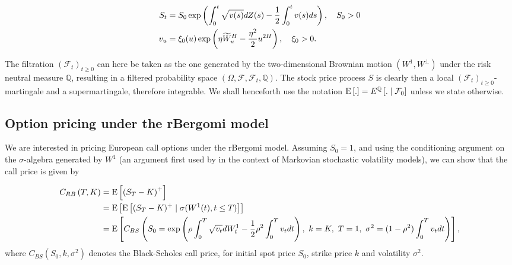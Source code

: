 \begin{align}\label{eq:rBergomi_model}
	S_t&= S_0  \operatorname{exp}\left( \int_{0}^{t} \sqrt{v(s)} dZ(s)- \frac{1}{2} \int_{0}^{t} v(s) ds   \right),\quad S_0>0 \nonumber\\
	v_u&=\xi_0(u) \operatorname{exp}\left( \eta \widetilde{W}_u^H- \frac{\eta^2}{2} u^{2H} \right), \quad \xi_0>0 .
\end{align}


The filtration $(\mathcal{F}_t)_{t\ge 0}$ can here be taken as the one generated by the two-dimensional Brownian motion $(W^1,W^\perp)$ under the risk neutral measure $\mathbb{Q}$, resulting in  a filtered probability space $(\Omega,\mathcal{F}, \mathcal{F}_t,\mathbb{Q})$. The stock price process $S$ is clearly then a local
$(\mathcal{F}_t)_{t\ge 0}$-martingale and a supermartingale, therefore integrable.  We shall henceforth use the notation $\mathrm{E}\left[.\right] = E^{\mathbb{Q}}\left[. \mid \mathcal{F}_0\right]$ unless we state otherwise.








\subsection{Option pricing under the rBergomi model}\label{sec:Option pricing under rBergomi model}

We are interested in pricing European call options under the rBergomi model. Assuming $S_0 = 1$, and using the conditioning argument on the $\sigma$-algebra generated by $W^1$ (an argument first used by \cite{romano1997contingent} in the context of Markovian stochastic volatility  models), we can  show that the call price is given by

\begin{align}\label{BS_formula_rbergomi}
	C_{RB}\left( T, K \right) &= \text{E}\left[ \left(S_T - K \right)^+ \right]  \nonumber\\
	&=\mathrm{E}\left[\mathrm{E}\left[(S_T-K)^+ \mid \sigma(W^1(t) ,t \le T)\right]\right]\nonumber \\
	&=\text{E}\left[C_{BS}\left( S_0 = \operatorname{exp}\left(\rho \int_0^T \sqrt{v_t} dW_t^1 - \frac{1}{2}
	\rho^2 \int_0^T v_t dt\right),\ k = K, \ T = 1, \ \sigma^2 = (1-\rho^2)
	\int_0^T v_t dt \right) \right],
\end{align}
where $C_{BS}(S_0,k,\sigma^2)$ denotes the Black-Scholes call price, for initial spot price $S_0$, strike price $k$ and volatility $\sigma^2$.

